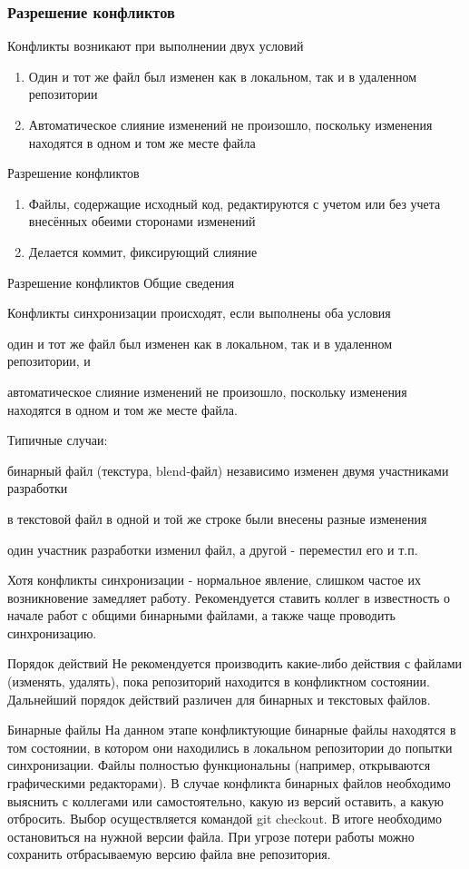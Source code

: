 \documentclass{../industrial-development}
\begin{document}
\begin{frame} \frametitle{Разрешение конфликтов}
Конфликты возникают при выполнении двух условий
  \begin{enumerate}
  \item Один и тот же файл был изменен как в локальном, так и в удаленном репозитории
  \item Автоматическое слияние изменений не произошло, поскольку изменения находятся в одном и том же месте файла
  \end{enumerate}
Разрешение конфликтов
  \begin{enumerate}
  \item Файлы, содержащие исходный код, редактируются с учетом или без учета внесённых обеими сторонами изменений
  \item Делается коммит, фиксирующий слияние
  \end{enumerate}
\end{frame}

\lecturenotes

Разрешение конфликтов
Общие сведения

Конфликты синхронизации происходят, если выполнены оба условия

    один и тот же файл был изменен как в локальном, так и в удаленном репозитории, и

    автоматическое слияние изменений не произошло, поскольку изменения находятся в одном и том же месте файла.

Типичные случаи:

    бинарный файл (текстура, blend-файл) независимо изменен двумя участниками разработки

    в текстовой файл в одной и той же строке были внесены разные изменения

    один участник разработки изменил файл, а другой - переместил его и т.п.

Хотя конфликты синхронизации - нормальное явление, слишком частое их возникновение замедляет работу. Рекомендуется ставить коллег в известность о начале работ с общими бинарными файлами, а также чаще проводить синхронизацию.

Порядок действий
Не рекомендуется производить какие-либо действия с файлами (изменять, удалять), пока репозиторий находится в конфликтном состоянии.
Дальнейший порядок действий различен для бинарных и текстовых файлов.

Бинарные файлы
На данном этапе конфликтующие бинарные файлы находятся в том состоянии, в котором они находились в локальном репозитории до попытки синхронизации. Файлы полностью функциональны (например, открываются графическими редакторами).
В случае конфликта бинарных файлов необходимо выяснить с коллегами или самостоятельно, какую из версий оставить, а какую отбросить. Выбор осуществляется командой git checkout.
В итоге необходимо остановиться на нужной версии файла. При угрозе потери работы можно сохранить отбрасываемую версию файла вне репозитория.
\end{document}
